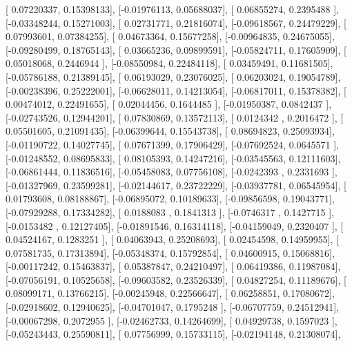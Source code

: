 \documentclass{article}
\begin{document}
       [ 0.07220337,  0.15398133],
       [-0.01976113,  0.05688037],
       [ 0.06855274,  0.2395488 ],
       [-0.03348244,  0.15271003],
       [ 0.02731771,  0.21816074],
       [-0.09618567,  0.24479229],
       [ 0.07993601,  0.07384255],
       [ 0.04673364,  0.15677258],
       [-0.00964835,  0.24675055],
       [-0.09280499,  0.18765143],
       [ 0.03665236,  0.09899591],
       [-0.05824711,  0.17605909],
       [ 0.05018068,  0.2446944 ],
       [-0.08550984,  0.22484118],
       [ 0.03459491,  0.11681505],
       [-0.05786188,  0.21389145],
       [ 0.06193029,  0.23076025],
       [ 0.06203024,  0.19054789],
       [-0.00238396,  0.25222001],
       [-0.06628011,  0.14213054],
       [-0.06817011,  0.15378382],
       [ 0.00474012,  0.22491655],
       [ 0.02044456,  0.1644485 ],
       [-0.01950387,  0.0842437 ],
       [-0.02743526,  0.12944201],
       [ 0.07830869,  0.13572113],
       [ 0.0124342 ,  0.2016472 ],
       [ 0.05501605,  0.21091435],
       [-0.06399644,  0.15543738],
       [ 0.08694823,  0.25093934],
       [-0.01190722,  0.14027745],
       [ 0.07671399,  0.17906429],
       [-0.07692524,  0.0645571 ],
       [-0.01248552,  0.08695833],
       [ 0.08105393,  0.14247216],
       [-0.03545563,  0.12111603],
       [-0.06861444,  0.11836516],
       [-0.05458083,  0.07756108],
       [-0.0242393 ,  0.2331693 ],
       [-0.01327969,  0.23599281],
       [-0.02144617,  0.23722229],
       [-0.03937781,  0.06545954],
       [ 0.01793608,  0.08188867],
       [-0.06895072,  0.10189633],
       [-0.09856598,  0.19043771],
       [-0.07929288,  0.17334282],
       [ 0.0188083 ,  0.1841313 ],
       [-0.0746317 ,  0.1427715 ],
       [-0.0153482 ,  0.12127405],
       [-0.01891546,  0.16314118],
       [-0.04159049,  0.2320407 ],
       [ 0.04524167,  0.1283251 ],
       [ 0.04063943,  0.25208693],
       [ 0.02454598,  0.14959955],
       [ 0.07581735,  0.17313894],
       [-0.05348374,  0.15792854],
       [ 0.04600915,  0.15068816],
       [-0.00117242,  0.15463837],
       [ 0.05387847,  0.24210497],
       [ 0.06419386,  0.11987084],
       [-0.07056191,  0.10525658],
       [-0.09603582,  0.23526339],
       [ 0.04827254,  0.11189676],
       [ 0.08099171,  0.13766215],
       [-0.00245948,  0.22566647],
       [ 0.06258851,  0.17080672],
       [-0.02918602,  0.12940625],
       [-0.04701047,  0.1795248 ],
       [-0.06707759,  0.24512941],
       [-0.00067298,  0.2072955 ],
       [-0.02462733,  0.14264699],
       [ 0.04929738,  0.1597023 ],
       [-0.05243443,  0.25590811],
       [ 0.07756999,  0.15733115],
       [-0.02194148,  0.21308074],
\end{document}
